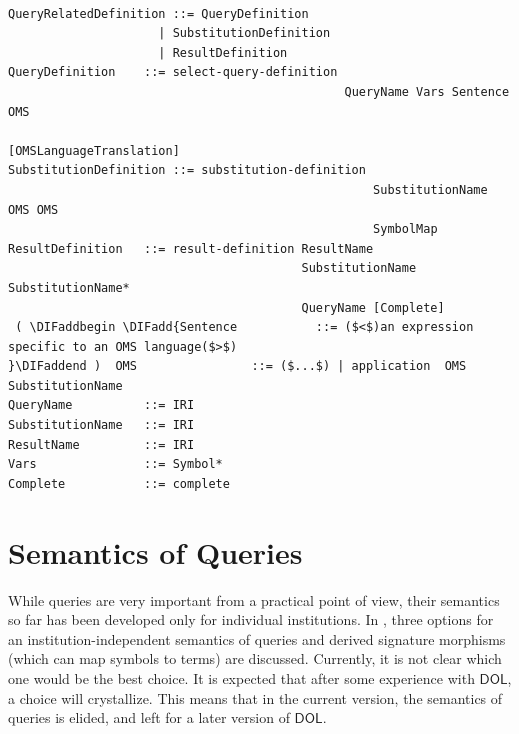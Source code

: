 \documentclass[10pt,fleqn,final]{scrreprt}
\newcommand*{\syntax}[1]{\texttt{#1}}
\newcommand{\semdom}[1]{
\begin{center}
\fbox{$#1$}
\end{center}
}
\newcommand*{\DOL}{\ensuremath{\mathsf{DOL}}\xspace}
\newcommand{\sclause}[1]{\section{#1}}
\providecommand{\DIFadd}[1]{{\protect\color{blue}\uwave{#1}}} %
\providecommand{\DIFaddbegin}{} %
\providecommand{\DIFaddend}{} %
\begin{document}
\begin{lstlisting}[language=ebnf,escapeinside={()},mathescape]  % abstract syntax

QueryRelatedDefinition ::= QueryDefinition
                     | SubstitutionDefinition
                     | ResultDefinition
QueryDefinition    ::= select-query-definition
                                               QueryName Vars Sentence OMS
                                               [OMSLanguageTranslation]
SubstitutionDefinition ::= substitution-definition
                                                   SubstitutionName OMS OMS
                                                   SymbolMap
ResultDefinition   ::= result-definition ResultName
                                         SubstitutionName SubstitutionName*
                                         QueryName [Complete]
 ( \DIFaddbegin \DIFadd{Sentence           ::= ($<$)an expression specific to an OMS language($>$) 
}\DIFaddend )  OMS                ::= ($...$) | application  OMS  SubstitutionName 
QueryName          ::= IRI
SubstitutionName   ::= IRI
ResultName         ::= IRI
Vars               ::= Symbol*
Complete           ::= complete
\end{lstlisting}


\sclause{Semantics of Queries}\label{s:sem-queries}

While queries are very important from a practical point of view, their
semantics so far has been developed only for individual institutions.
In \cite{MossakowskiEtAl15a}, three options for an
institution-independent semantics of queries and derived signature
morphisms (which can map symbols to terms) are discussed. Currently,
it is not clear which one would be the best choice. It is expected
that after some experience with \DOL, a choice will crystallize. This
means that in the current version, the semantics of queries is
elided, and left for a later version of \DOL.

%
%
%
%

\end{document}
